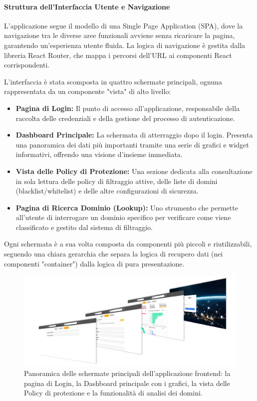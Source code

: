 \documentclass[12pt,a4paper,openright,twoside]{book}
\begin{document}
\paragraph{Struttura dell'Interfaccia Utente e Navigazione}
L'applicazione segue il modello di una Single Page Application (SPA), dove la navigazione tra le diverse aree funzionali avviene senza ricaricare la pagina, garantendo un'esperienza utente fluida. La logica di navigazione è gestita dalla libreria React Router, che mappa i percorsi dell'URL ai componenti React corrispondenti.

L'interfaccia è stata scomposta in quattro schermate principali, ognuna rappresentata da un componente "vista" di alto livello:
\begin{itemize}
    \item \textbf{Pagina di Login:} Il punto di accesso all'applicazione, responsabile della raccolta delle credenziali e della gestione del processo di autenticazione.
    \item \textbf{Dashboard Principale:} La schermata di atterraggio dopo il login. Presenta una panoramica dei dati più importanti tramite una serie di grafici e widget informativi, offrendo una visione d'insieme immediata.
    \item \textbf{Vista delle Policy di Protezione:} Una sezione dedicata alla consultazione in sola lettura delle policy di filtraggio attive, delle liste di domini (blacklist/whitelist) e delle altre configurazioni di sicurezza.
    \item \textbf{Pagina di Ricerca Dominio (Lookup):} Uno strumento che permette all'utente di interrogare un dominio specifico per verificare come viene classificato e gestito dal sistema di filtraggio.
\end{itemize}
Ogni schermata è a sua volta composta da componenti più piccoli e riutilizzabili, seguendo una chiara gerarchia che separa la logica di recupero dati (nei componenti "container") dalla logica di pura presentazione.

\begin{figure}[H]
    \centering
    \includegraphics[width=\textwidth]{figures/slideshow.png}
    \caption{Panoramica delle schermate principali dell'applicazione frontend: la pagina di Login, la Dashboard principale con i grafici, la vista delle Policy di protezione e la funzionalità di analisi dei domini.}
    \label{fig:ui_screens}
\end{figure}
\end{document}

